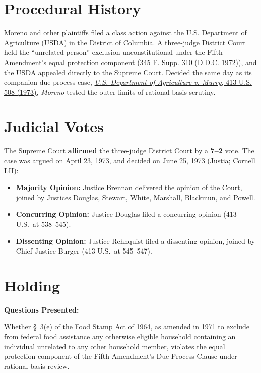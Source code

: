 \documentclass[12pt]{article}
\begin{document}
\section{Procedural History}
Moreno and other plaintiffs filed a class action against the U.S. Department of Agriculture (USDA) in the District of Columbia. A three-judge District Court held the ``unrelated person'' exclusion unconstitutional under the Fifth Amendment's equal protection component (345 F. Supp. 310 (D.D.C. 1972)), and the USDA appealed directly to the Supreme Court. Decided the same day as its companion due-process case, \href{https://supreme.justia.com/cases/federal/us/413/508/}{\textit{U.S. Department of Agriculture v. Murry}, 413 U.S. 508 (1973)}, \textit{Moreno} tested the outer limits of rational-basis scrutiny.

\section{Judicial Votes}
The Supreme Court \textbf{affirmed} the three-judge District Court by a \textbf{7--2} vote. The case was argued on April 23, 1973, and decided on June 25, 1973 (\href{https://supreme.justia.com/cases/federal/us/413/528/}{Justia}; \href{https://www.law.cornell.edu/supremecourt/text/413/528}{Cornell LII}):

\begin{itemize}
    \item \textbf{Majority Opinion:} Justice Brennan delivered the opinion of the Court, joined by Justices Douglas, Stewart, White, Marshall, Blackmun, and Powell.
    \item \textbf{Concurring Opinion:} Justice Douglas filed a concurring opinion (413 U.S.\ at 538--545).
    \item \textbf{Dissenting Opinion:} Justice Rehnquist filed a dissenting opinion, joined by Chief Justice Burger (413 U.S.\ at 545--547).
\end{itemize}

\section{Holding}
\textbf{Questions Presented:}

Whether \S~3(e) of the Food Stamp Act of 1964, as amended in 1971 to exclude from federal food assistance any otherwise eligible household containing an individual unrelated to any other household member, violates the equal protection component of the Fifth Amendment's Due Process Clause under rational-basis review.
\end{document}
